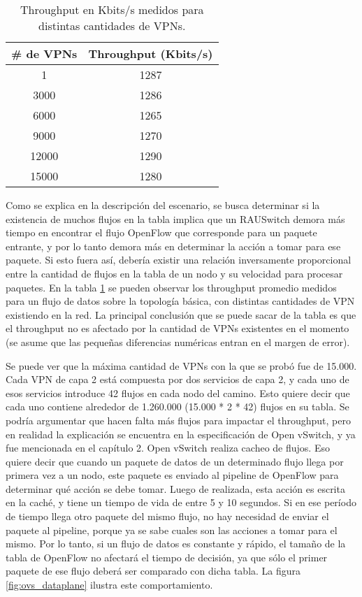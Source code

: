 \begin{table}[ht]
	\caption{Throughput en Kbits/s medidos para distintas cantidades de VPNs.}
	\centering 
	\begin{tabular}{c c}
		\hline\hline
		\# de VPNs & Throughput (Kbits/s) \\ [0.5ex]
		\hline
		1 & 1287 \\
		3000 & 1286 \\
		6000 & 1265 \\
		9000 & 1270 \\
		12000 & 1290 \\
		15000 & 1280 \\ [1ex]
		\hline
	\end{tabular}
	\label{table:escala_de_servicios}
\end{table}

Como se explica en la descripción del escenario, se busca determinar si la existencia de muchos flujos en la tabla implica que un RAUSwitch demora más tiempo en encontrar el flujo OpenFlow que corresponde para un paquete entrante, y por lo tanto demora más en determinar la acción a tomar para ese paquete. Si esto fuera así, debería existir una relación inversamente proporcional entre la cantidad de flujos en la tabla de un nodo y su velocidad para procesar paquetes. En la tabla \ref{table:escala_de_servicios} se pueden observar los throughput promedio medidos para un flujo de datos sobre la topología básica, con distintas cantidades de VPN existiendo en la red. La principal conclusión que se puede sacar de la tabla es que el throughput no es afectado por la cantidad de VPNs existentes en el momento (se asume que las pequeñas diferencias numéricas entran en el margen de error).

Se puede ver que la máxima cantidad de VPNs con la que se probó fue de 15.000. Cada VPN de capa 2 está compuesta por dos servicios de capa 2, y cada uno de esos servicios introduce 42 flujos en cada nodo del camino. Esto quiere decir que cada uno contiene alrededor de 1.260.000 (15.000 * 2 * 42) flujos en su tabla. Se podría argumentar que hacen falta más flujos para impactar el throughput, pero en realidad la explicación se encuentra en la especificación de Open vSwitch, y ya fue mencionada en el capítulo 2. Open vSwitch realiza cacheo de flujos. Eso quiere decir que cuando un paquete de datos de un determinado flujo llega por primera vez a un nodo, este paquete es enviado al pipeline de OpenFlow para determinar qué acción se debe tomar. Luego de realizada, esta acción es escrita en la caché, y tiene un tiempo de vida de entre 5 y 10 segundos. Si en ese período de tiempo llega otro paquete del mismo flujo, no hay necesidad de enviar el paquete al pipeline, porque ya se sabe cuales son las acciones a tomar para el mismo. Por lo tanto, si un flujo de datos es constante y rápido, el tamaño de la tabla de OpenFlow no afectará el tiempo de decisión, ya que sólo el primer paquete de ese flujo deberá ser comparado con dicha tabla. La figura \ref{fig:ovs_dataplane} ilustra este comportamiento.

